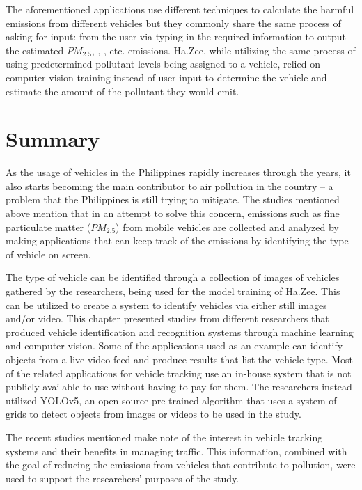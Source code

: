 	The aforementioned applications use different techniques to calculate the harmful emissions from different vehicles but they commonly share the same process of asking for input: from the user via typing in the required information to output the estimated $PM_{2.5}$, , , etc. emissions. Ha.Zee, while utilizing the same process of using predetermined pollutant levels being assigned to a vehicle, relied on computer vision training instead of user input to determine the vehicle and estimate the amount of the pollutant they would emit.

\section{Summary}
 As the usage of vehicles in the Philippines rapidly increases through the years, it also starts becoming the main contributor to air pollution in the country – a problem that the Philippines is still trying to mitigate. The studies mentioned above mention that in an attempt to solve this concern, emissions such as fine particulate matter ($PM_{2.5}$) from mobile vehicles are collected and analyzed by making applications that can keep track of the emissions by identifying the type of vehicle on screen.

	The type of vehicle can be identified through a collection of images of vehicles gathered by the researchers, being used for the model training of Ha.Zee.  This can be utilized to create a system to identify vehicles via either still images and/or video. This chapter presented studies from different researchers that produced vehicle identification and recognition systems through machine learning and computer vision. Some of the applications used as an example can identify objects from a live video feed and produce results that list the vehicle type. Most of the related applications for vehicle tracking use an in-house system that is not publicly available to use without having to pay for them. The researchers instead utilized YOLOv5, an open-source pre-trained algorithm that uses a system of grids to detect objects from images or videos to be used in the study.
	

	The recent studies mentioned make note of the interest in vehicle tracking systems and their benefits in managing traffic. This information, combined with the goal of reducing the emissions from vehicles that contribute to pollution, were used to support the researchers’ purposes of the study.



